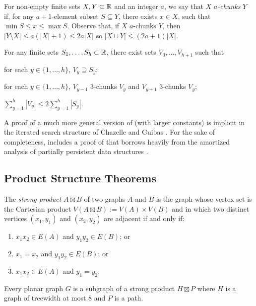 \documentclass[kpfonts]{patmorin}
\let\le\leqslant
\begin{document}
For non-empty finite sets $X,Y\subset \mathbb{R}$ and an integer $a$, we say that $X$ \emph{$a$-chunks} $Y$ if, for any $a+1$-element subset $S\subseteq Y$, there exists $x\in X$, such that $\min S\le x\le \max S$. Observe that, if $X$ $a$-chunks $Y$, then $|Y\setminus X|\le a(|X|+1)\le 2a|X|$ so $|X\cup Y|\le (2a+1)|X|$. 

\begin{lem}
  For any finite sets $S_1,\ldots,S_h\subset\mathbb{R}$, there exist sets $V_0,\ldots,V_{h+1}$ such that
  \begin{compactenum}
    \item for each $y\in\{1,\ldots,h\}$, $V_y\supseteq S_y$;
    \item for each $y\in\{1,\ldots,h\}$, $V_{y-1}$ 3-chunks $V_y$ and $V_{y+1}$ 3-chunks $V_y$;
    \item $\sum_{y=1}^h |V_y|\le 2\sum_{y=1}^h |S_y|$.
  \end{compactenum}
\end{lem}

A proof of a much more general version of  (with larger constants) is implicit in the iterated search structure of Chazelle and Guibas \cite{chazelle.guibas:fractional1}.   For the sake of completeness,  includes a proof of  that borrows heavily from the amortized analysis of partially persistent data structures \cite[Section~2.3]{driscoll.sarnak.ea:making}.


\subsection{Product Structure Theorems}

The \emph{strong product} $A\boxtimes B$ of two graphs $A$ and $B$ is the graph whose vertex set is the Cartesian product $V(A\boxtimes B):=V(A)\times V(B)$ and in which two distinct vertices $(x_1,y_1)$ and $(x_2,y_2)$ are adjacent if and only if:
\begin{enumerate}
  \item  $x_1x_2 \in E(A)$ and $y_1y_2 \in E(B)$; or
  \item $x_1=x_2$ and $y_1y_2\in E(B)$; or
  \item $x_1x_2 \in E(A)$ and $y_1=y_2$.
\end{enumerate}

\begin{thm}
  Every planar graph $G$ is a subgraph of a strong product $H\boxtimes P$ where $H$ is a graph of treewidth at most 8 and $P$ is a path.
\end{thm}
\end{document}

